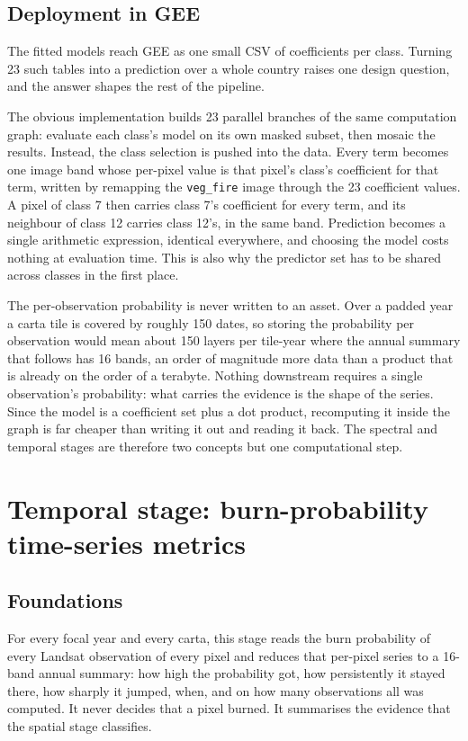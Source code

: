 \documentclass[11pt,a4paper]{article}
\begin{document}
\subsection{Deployment in GEE}\label{sec-deploy}

The fitted models reach GEE as one small CSV of coefficients per class. Turning 23 such tables into
a prediction over a whole country raises one design question, and the answer shapes the rest of the
pipeline.

The obvious implementation builds 23 parallel branches of the same computation graph: evaluate
each class's model on its own masked subset, then mosaic the results. Instead, the class selection
is pushed into the data. Every term becomes one image band whose per-pixel value is that pixel's
class's coefficient for that term, written by remapping the \texttt{veg\_fire} image through the
23 coefficient values. A pixel of class 7 then carries class 7's coefficient for every term, and
its neighbour of class 12 carries class 12's, in the same band. Prediction becomes a single
arithmetic expression, identical everywhere, and choosing the model costs nothing at evaluation
time. This is also why the predictor set has to be shared across classes in the first place.

The per-observation probability is never written to an asset. Over a padded year a carta tile is
covered by roughly 150 dates, so storing the probability per observation would mean about 150
layers per tile-year where the annual summary that follows has 16 bands, an order of magnitude
more data than a product that is already on the order of a terabyte. Nothing downstream requires
a single observation's probability: what carries the evidence is the shape of the series. Since
the model is a coefficient set plus a dot product, recomputing it inside the graph is far cheaper
than writing it out and reading it back. The spectral and temporal stages are therefore two
concepts but one computational step.

\section{Temporal stage: burn-probability time-series metrics}\label{sec-temporal}

\subsection{Foundations}

For every focal year and every carta, this stage reads the burn probability of every Landsat
observation of every pixel and reduces that per-pixel series to a 16-band annual summary: how high
the probability got, how persistently it stayed there, how sharply it jumped, when, and on how
many observations all was computed. It never decides that a pixel burned. It summarises the evidence
that the spatial stage classifies.
\end{document}
